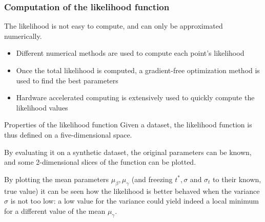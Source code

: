 \documentclass{beamer}
\begin{document}
\begin{frame}
  \frametitle{Computation of the likelihood function}
  The likelihood is not easy to compute, and can only be approximated numerically.

  \begin{itemize}
  \item Different numerical methods are used to compute each point's likelihood
  \item Once the total likelihood is computed, a gradient-free optimization method is used to find the best parameters
  \item Hardware accelerated computing is extensively used to quickly compute the likelihood values
  \end{itemize}
\end{frame}

\begin{frame}{Properties of the likelihood function}
  Given a dataset, the likelihood function is thus defined on a five-dimensional space.

  By evaluating it on a synthetic dataset, the original parameters can be known,
  and some 2-dimensional slices of the function can be plotted.

  By plotting the mean parameters \(\mu_\beta, \mu_\gamma\) (and freezing \(t^*, \sigma\) and \(\sigma_t\) to their known, true value) it can be seen how the likelihood is better behaved when the variance \(\sigma\) is not too low:
a low value for the variance could yield indeed a local minimum for a different value of the mean \(\mu_\gamma\).
  
\end{frame}
\end{document}
